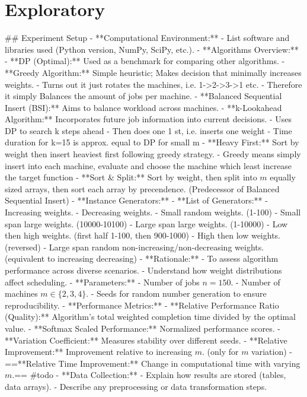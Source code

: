 \chapter{Exploratory}

\begin{markdown}
## Experiment Setup
- **Computational Environment:**
  - List software and libraries used (Python version, NumPy, SciPy, etc.).
- **Algorithms Overview:**
  - **DP (Optimal):** Used as a benchmark for comparing other algorithms.
  - **Greedy Algorithm:** Simple heuristic; Makes decision that minimally increases weights.
    - Turns out it just rotates the machines, i.e. 1->2->3->1 etc.
    - Therefore it simply Balances the amount of jobs per machine.
  - **Balanced Sequential Insert (BSI):** Aims to balance workload across machines.
  - **k-Lookahead Algorithm:** Incorporates future job information into current decisions.
    - Uses DP to search k steps ahead
    - Then does one 1 st, i.e. inserts one weight
    - Time duration for k=15 is approx. equal to DP for small m
  - **Heavy First:** Sort by weight then insert heaviest first following greedy
    strategy.
    - Greedy means simply insert into each machine, evaluate and choose the machine which least increase the target function
- **Sort & Split:** Sort by weight, then split into $m$ equally sized arrays, then
  sort each array by precendence. (Predecessor of Balanced Sequential Insert)
- **Instance Generators:**
  - **List of Generators:**
    - Increasing weights.
    - Decreasing weights.
    - Small random weights. (1-100)
    - Small span large weights. (10000-10100)
    - Large span large weights. (1-10000)
    - Low then high weights. (first half 1-100, then 900-1000)
    - High then low weights. (reversed)
    - Large span random non-increasing/non-decreasing weights. (equivalent to increasing
      decreasing)
  - **Rationale:**
    - To assess algorithm performance across diverse scenarios.
    - Understand how weight distributions affect scheduling.
- **Parameters:**
  - Number of jobs $n = 150$.
  - Number of machines $m \in \{2, 3, 4\}$.
  - Seeds for random number generation to ensure reproducibility.
- **Performance Metrics:**
  - **Relative Performance Ratio (Quality):** Algorithm's total weighted completion time
    divided
    by the optimal value.
  - **Softmax Scaled Performance:** Normalized performance scores.
  - **Variation Coefficient:** Measures stability over different seeds.
  - **Relative Improvement:** Improvement relative to increasing $m$. (only for $m$ variation)
  - ==**Relative Time Improvement:** Change in computational time with varying $m$.== #todo 
- **Data Collection:**
  - Explain how results are stored (tables, data arrays).
  - Describe any preprocessing or data transformation steps.


\end{markdown}
